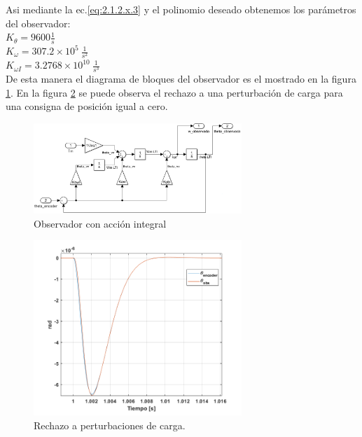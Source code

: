 \documentclass[10pt]{article}
\begin{document}
\begin{itemize}
	Asi mediante la ec.\ref{eq:2.1.2.x.3} y el polinomio deseado obtenemos los parámetros del observador:\\
	$K_{\theta}=9600 \frac{1}{s}$\\
	$K_{\omega}=307.2 \times 10^{5} \ \frac{1}{s^{2}}$\\
	$K_{\omega I}=3.2768 \times  10^{10} \ \frac{1}{s^{3}}$\\

	De esta manera el diagrama de bloques del observador es el mostrado en la figura \ref{fig:observadornuevo}. En la figura \ref{fig:obs} se puede observa el rechazo a una perturbación de carga para una consigna de posición igual a cero.
	\begin{figure}[h!]
		\centering
		\includegraphics[width=0.7\textwidth]{observadornuevo.png}
		\caption{\label{fig:observadornuevo}Observador con acción integral}
		\end{figure}
	
	\begin{figure}[h!]
		\centering
		\includegraphics[width=0.7\textwidth]{obs.png}
		\caption{\label{fig:obs}Rechazo a perturbaciones de carga.}
		\end{figure}


\end{itemize}
\end{document}
